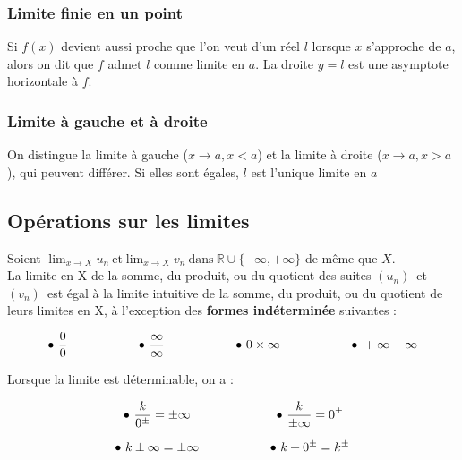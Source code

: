 \documentclass{report}
\newcommand{\un}{$(u_n)$~}
\newcommand{\vn}{$(v_n)$~}
\begin{document}
      \subsubsection{Limite finie en un point}
      Si \(f(x)\) devient aussi proche que l'on veut d'un réel $l$ lorsque \(x\) s'approche de \(a\), alors on dit que \(f\) admet $l$ comme limite en \(a\). La droite \(y=l\) est une asymptote horizontale à $f$.

      \subsubsection{Limite à gauche et à droite}
        On distingue la limite à gauche ($x\to a, x<a$) et la limite à droite ($x\to a, x>a$), qui peuvent différer. Si elles sont égales, $l$ est l'unique limite en $a$

    \subsection{Opérations sur les limites}

    Soient $\displaystyle \lim_{x\to X} u_n ~\text{et} \lim_{x\to X} v_n ~ \text{dans} ~ \mathbb{R}\cup \{-\infty,+\infty\} $ de même que $X$. \\
    La limite en X de la somme, du produit, ou du quotient des suites \un et \vn est égal à la limite intuitive de la somme, du produit, ou du quotient de leurs limites en X, 
    à l'exception des \textbf{formes indéterminée} suivantes : 

    \[
    \begin{array}{c@{\hspace{2cm}}c@{\hspace{2cm}}c@{\hspace{2cm}}c}
    \displaystyle \bullet \ \frac{0}{0} & \displaystyle \bullet \ \frac{\infty}{\infty} & \displaystyle \bullet \ 0 \times \infty & \displaystyle \bullet \ +\infty - \infty
    \end{array}
    \]

    Lorsque la limite est déterminable, on a :

    \[
    \begin{array}{c@{\hspace{2cm}}c}
      \displaystyle \bullet \ \frac{k}{0^\pm} = \pm \infty & \displaystyle \bullet \ \frac{k}{\pm\infty} = 0^\pm \\[0.5cm]
      \displaystyle \bullet \ k \pm \infty = \pm \infty & \displaystyle \bullet \ k + 0^\pm = k^\pm
    \end{array}
    \] \vspace{0.3cm}
\end{document}

